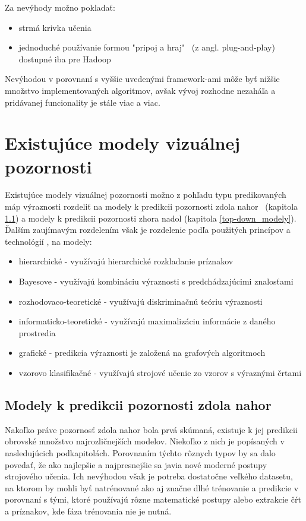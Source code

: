 Za nevýhody možno pokladať:
\begin{itemize}
	\item strmá krivka učenia
	\item jednoduché používanie formou "pripoj a hraj" \ (z angl. plug-and-play) dostupné iba pre Hadoop
\end{itemize}

Nevýhodou v porovnaní s vyššie uvedenými framework-ami môže byť nižšie množstvo implementovaných algoritmov, avšak vývoj rozhodne nezaháľa a pridávanej funcionality je stále viac a viac.

\newpage
\null
\thispagestyle{empty}
\newpage

\section{Existujúce modely vizuálnej pozornosti}
\label{saliency_models}
Existujúce modely vizuálnej pozornosti možno z pohľadu typu predikovaných máp výraznosti rozdeliť na modely k predikcii pozornosti zdola nahor \ (kapitola \ref{bottom-up_modely}) a modely k predikcii pozornosti zhora nadol (kapitola \ref{top-down_modely}). Ďalším zaujímavým rozdelením však je rozdelenie podľa použitých princípov a technológií \cite{polatsek}, na modely:

\begin{itemize}
	\item hierarchické - využívajú hierarchické rozkladanie príznakov
	\item Bayesove - využívajú kombináciu výraznosti s predchádzajúcimi znalosťami
	\item rozhodovaco-teoretické - využívajú diskriminačnú teóriu výraznosti
	\item informaticko-teoretické - využívajú maximalizáciu informácie z daného prostredia
	\item grafické - predikcia výraznosti je založená na grafových algoritmoch
	\item vzorovo klasifikačné - využívajú strojové učenie zo vzorov s výraznými črtami
\end{itemize}

\subsection{Modely k predikcii pozornosti zdola nahor}
\label{bottom-up_modely}
Nakoľko práve pozornosť zdola nahor bola prvá skúmaná, existuje k jej predikcii obrovské množstvo najrozličnejších modelov. Niekoľko z nich je popísaných v nasledujúcich podkapitolách. Porovnaním týchto rôznych typov by sa dalo povedať, že ako najlepšie a najpresnejšie sa javia nové moderné postupy strojového učenia. Ich nevýhodou však je potreba dostatočne veľkého datasetu, na ktorom by mohli byť natrénované ako aj značne dlhé trénovanie a predikcie v porovnaní s tými, ktoré používajú rôzne matematické postupy alebo extrakcie čŕt a príznakov, kde fáza trénovania nie je nutná.

